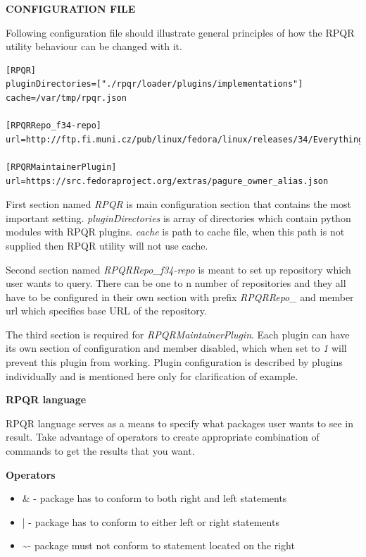 \textbf{CONFIGURATION FILE}

Following configuration file should illustrate general principles of how the RPQR utility behaviour
can be changed with it.

\begin{lstlisting}
[RPQR]
pluginDirectories=["./rpqr/loader/plugins/implementations"]
cache=/var/tmp/rpqr.json

[RPQRRepo_f34-repo]
url=http://ftp.fi.muni.cz/pub/linux/fedora/linux/releases/34/Everything/x86_64/os/

[RPQRMaintainerPlugin]
url=https://src.fedoraproject.org/extras/pagure_owner_alias.json
\end{lstlisting}

First section named \textit{RPQR} is main configuration section that contains the most important
setting. \textit{pluginDirectories} is array of directories which contain python modules with RPQR
plugins. \textit{cache} is path to cache file, when this path is not supplied then RPQR utility
will not use cache.

Second section named \textit{RPQRRepo\_f34-repo} is meant to set up repository which user wants to
query. There can be one to n number of repositories and they all have to be configured in their own
section with prefix \textit{RPQRRepo\_} and member url which specifies base URL of the repository.

The third section is required for \textit{RPQRMaintainerPlugin}. Each plugin can have its own section
of configuration and member disabled, which when set to \textit{1} will prevent this plugin from
working. Plugin configuration is described by plugins individually and is mentioned here only for
clarification of example. 

\textbf{RPQR language}

RPQR language serves as a means to specify what packages user wants to see in result. Take advantage
of operators to create appropriate combination of commands to get the results that you want.

\textbf{Operators}

\begin{itemize}
  \item \& - package has to conform to both right and left statements
  \item  | - package has to conform to either left or right statements
  \item  \textasciitilde - package must not conform to statement located on the right 
\end{itemize}

